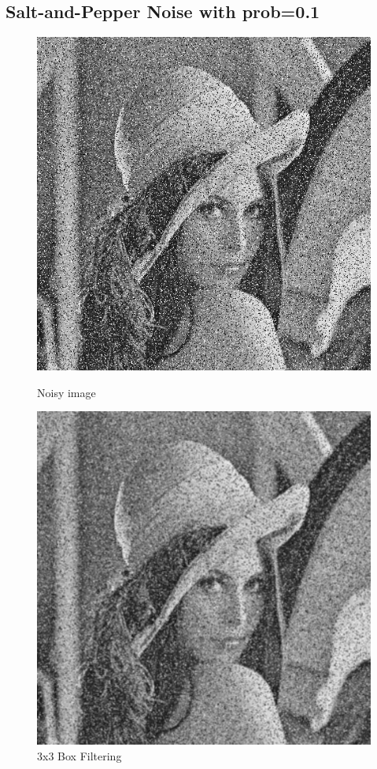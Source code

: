 \documentclass{article}
\begin{document}
\subsection{Salt-and-Pepper Noise with prob=0.1}
\begin{figure}[H]
  \includegraphics[width=\linewidth]{img/snp10.png}
  \caption{Noisy image}\label{fig:snp10}
\endminipage\hfill
{}
  \includegraphics[width=\linewidth]{img/snp10_box_3x3.png}
  \caption{3x3 Box Filtering}\label{fig:snp10_box_3x3}
\endminipage\hfill
\end{figure}
\end{document}
